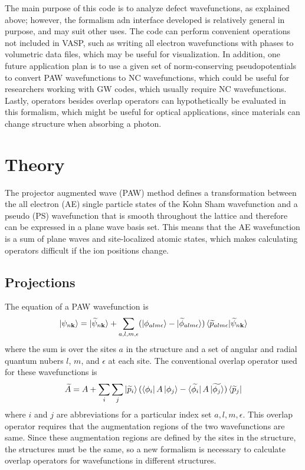 \documentclass[12pt]{article}
\begin{document}
The main purpose of this code is to analyze defect wavefunctions, as explained above;
however, the formalism adn interface developed is relatively general in purpose, and
may suit other uses. The code can perform convenient operations not included in VASP,
such as writing all electron wavefunctions with phases to volumetric data files, which may
be useful for visualization. In addition, one future application plan is to use a given
set of norm-conserving pseudopotentials to convert PAW wavefunctions to NC wavefunctions,
which could be useful for researchers working with GW codes, which usually require
NC wavefunctions. Lastly, operators besides overlap operators can hypothetically be evaluated
in this formalism, which might be useful for optical applications, since materials can
change structure when absorbing a photon.

\section{Theory}

The projector augmented wave (PAW) method defines a transformation between the all electron
(AE) single particle states of the Kohn Sham wavefunction and a pseudo (PS) wavefunction
that is smooth throughout the lattice and therefore can be expressed in a plane wave basis set.\cite{blochl}
This means that the AE wavefunction is a sum of plane waves and site-localized atomic states,
which makes calculating operators difficult if the ion positions change.

\subsection{Projections}

The equation of a PAW wavefunction is\cite{blochl}
\begin{equation}
\ket{\psi_{n\mathbf{k}}}=\ket{\widetilde{\psi}_{n\mathbf{k}}}+
\sum_{a,l,m,\epsilon}(\ket{\phi_{alm\epsilon}}-\ket{\widetilde{\phi}_{alm\epsilon}})
\braket{\widetilde{p}_{alm\epsilon}|\widetilde{\psi}_{n\mathbf{k}}}
\label{eq:1}
\end{equation}
where the sum is over the sites $a$ in the structure and a set of
angular and radial quantum nubers $l$, $m$, and $\epsilon$ at each site.
The conventional overlap operator used for these wavefunctions is
\begin{equation}
\widetilde{A}=A+\sum_i\sum_j\ket{\widetilde{p}_i}(\bra{\phi_i}A\ket{\phi_j}
-\bra{\widetilde{\phi_i}}A\ket{\widetilde{\phi_j}})\bra{\widetilde{p}_j}
\label{eq:loc}
\end{equation}
where $i$ and $j$ are abbreviations for a particular index set
$a,l,m,\epsilon$. This overlap operator requires that the augmentation
regions of the two wavefunctions are same. Since these augmentation regions
are defined by the sites in the structure, the structures must be the same,
so a new formalism is necessary to calculate overlap operators for wavefunctions
in different structures.
\end{document}

